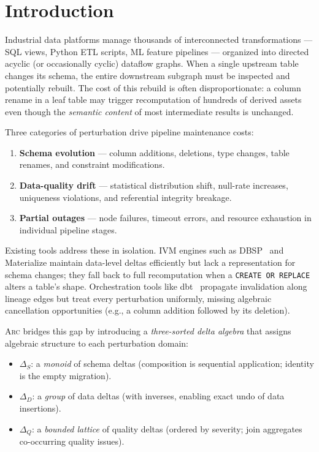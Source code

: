\documentclass[sigplan,screen,nonacm]{acmart}
\newcommand{\arc}{\textsc{Arc}\xspace}
\newcommand{\DeltaS}{\Delta_{\!S}}
\newcommand{\DeltaD}{\Delta_{\!D}}
\newcommand{\DeltaQ}{\Delta_{\!Q}}
\begin{document}
\section{Introduction}\label{sec:intro}

Industrial data platforms manage thousands of interconnected transformations
--- SQL views, Python ETL scripts, ML feature pipelines --- organized into
directed acyclic (or occasionally cyclic) dataflow graphs.  When a single
upstream table changes its schema, the entire downstream subgraph must be
inspected and potentially rebuilt.  The cost of this rebuild is often
disproportionate: a column rename in a leaf table may trigger recomputation of
hundreds of derived assets even though the \emph{semantic content} of most
intermediate results is unchanged.

Three categories of perturbation drive pipeline maintenance costs:

\begin{enumerate}
\item \textbf{Schema evolution} --- column additions, deletions, type
  changes, table renames, and constraint modifications.
\item \textbf{Data-quality drift} --- statistical distribution shift,
  null-rate increases, uniqueness violations, and referential integrity
  breakage.
\item \textbf{Partial outages} --- node failures, timeout errors, and
  resource exhaustion in individual pipeline stages.
\end{enumerate}

Existing tools address these in isolation.  IVM engines such as
DBSP~\cite{budiu2023dbsp} and Materialize maintain data-level deltas
efficiently but lack a representation for schema changes; they fall back to
full recomputation when a \texttt{CREATE OR REPLACE} alters a table's shape.
Orchestration tools like dbt~\cite{dbt2023} propagate invalidation along
lineage edges but treat every perturbation uniformly, missing algebraic
cancellation opportunities (e.g., a column addition followed by its deletion).

\arc bridges this gap by introducing a \emph{three-sorted delta algebra} that
assigns algebraic structure to each perturbation domain:
\begin{itemize}
\item $\DeltaS$: a \emph{monoid} of schema deltas (composition is
  sequential application; identity is the empty migration).
\item $\DeltaD$: a \emph{group} of data deltas (with inverses, enabling
  exact undo of data insertions).
\item $\DeltaQ$: a \emph{bounded lattice} of quality deltas (ordered by
  severity; join aggregates co-occurring quality issues).
\end{itemize}
\end{document}
